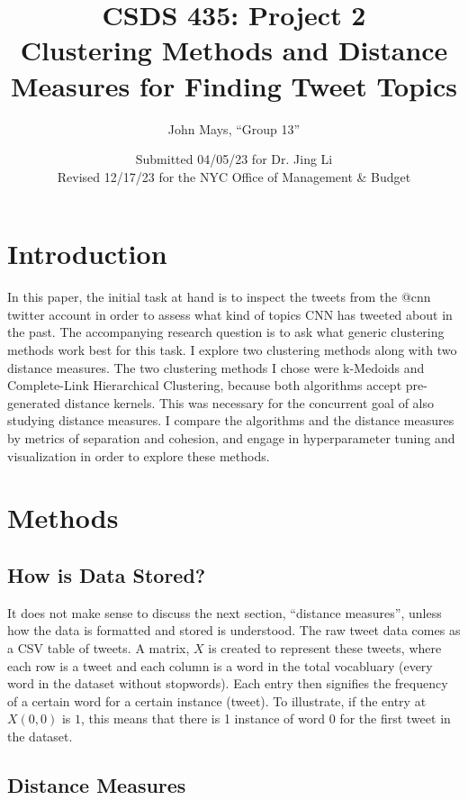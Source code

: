 \documentclass[fleqn]{article}
\title{\textbf{CSDS 435: Project 2\\\large{Clustering Methods and Distance Measures for Finding Tweet Topics}}}
\author{John Mays, ``Group 13''}
\date{Submitted 04/05/23 for Dr. Jing Li \\ Revised 12/17/23 for the NYC Office of Management \& Budget}
\begin{document}
\maketitle
\section{Introduction}
In this paper, the initial task at hand is to inspect the tweets from the @cnn twitter account in order to assess what kind of topics CNN has tweeted about in the past.  The accompanying research question is to ask what generic clustering methods work best for this task. I explore two clustering methods along with two distance measures.  The two clustering methods I chose were k-Medoids and Complete-Link Hierarchical Clustering, because both algorithms accept pre-generated distance kernels.  This was necessary for the concurrent goal of also studying distance measures.  I compare the algorithms and the distance measures by metrics of separation and cohesion, and engage in hyperparameter tuning and visualization in order to explore these methods.
\section{Methods}
\subsection{How is Data Stored?}
It does not make sense to discuss the next section, ``distance measures'', unless how the data is formatted and stored is understood.  The raw tweet data comes as a CSV table of tweets.  A matrix, $X$ is created to represent these tweets, where each row is a tweet and each column is a word in the total vocabluary (every word in the dataset without stopwords).  Each entry then signifies the frequency of a certain word for a certain instance (tweet).  To illustrate, if the entry at $X(0,0)$ is $1$, this means that there is 1 instance of word $0$ for the first tweet in the dataset.
\subsection{Distance Measures}
\end{document}
